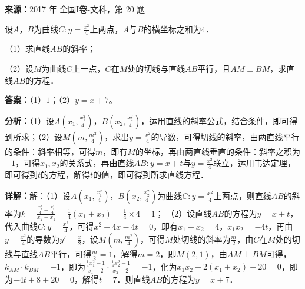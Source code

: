 \begin{question}[points=12]
\textbf{来源：}2017 年 全国I卷-文科，第 20 题\par
设$A$，$B$为曲线$C:y=\frac{x^2}{4}$上两点，$A$与$B$的横坐标之和为$4$．

（1）求直线$AB$的斜率；

（2）设$M$为曲线$C$上一点，$C$在$M$处的切线与直线$AB$平行，且$AM\perp BM$，求直线$AB$的方程．
\begin{solution}
\textbf{答案：}（1）$1$；（2）$y=x+7$。

\textbf{分析：}（1）设$A(x_1,\frac{x_1^2}{4})$，$B(x_2,\frac{x_2^2}{4})$，运用直线的斜率公式，结合条件，即可得到所求；（2）设$M(m,\frac{m^2}{4})$，求出$y=\frac{x^2}{4}$的导数，可得切线的斜率，由两直线平行的条件：斜率相等，可得$m$，即有$M$的坐标，再由两直线垂直的条件：斜率之积为$-1$，可得$x_1,x_2$的关系式，再由直线$AB:y=x+t$与$y=\frac{x^2}{4}$联立，运用韦达定理，即可得到$t$的方程，解得$t$的值，即可得到所求直线方程．

\textbf{详解：}解：（1）设$A(x_1,\frac{x_1^2}{4})$，$B(x_2,\frac{x_2^2}{4})$为曲线$C:y=\frac{x^2}{4}$上两点，则直线$AB$的斜率为$k=\frac{\frac{x_2^2}{4}-\frac{x_1^2}{4}}{x_2-x_1}=\frac{1}{4}(x_1+x_2)=\frac{1}{4}\times4=1$；
（2）设直线$AB$的方程为$y=x+t$，代入曲线$C:y=\frac{x^2}{4}$，可得$x^2-4x-4t=0$，即有$x_1+x_2=4$，$x_1x_2=-4t$，再由$y=\frac{x^2}{4}$的导数为$y'=\frac{x}{2}$，设$M(m,\frac{m^2}{4})$，可得$M$处切线的斜率为$\frac{m}{2}$，由$C$在$M$处的切线与直线$AB$平行，可得$\frac{m}{2}=1$，解得$m=2$，即$M(2,1)$，由$AM\perp BM$可得，$k_{AM}\cdot k_{BM}=-1$，即为$\frac{\frac{1}{4}x_1^2-1}{x_1-2}\cdot\frac{\frac{1}{4}x_2^2-1}{x_2-2}=-1$，化为$x_1x_2+2(x_1+x_2)+20=0$，即为$-4t+8+20=0$，解得$t=7$．则直线$AB$的方程为$y=x+7$．
\end{solution}
\end{question}

